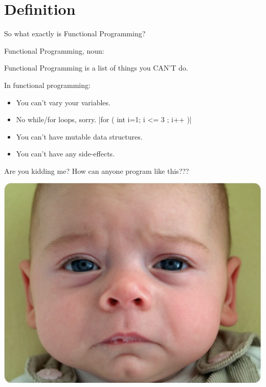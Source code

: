 \documentclass{beamer}
\begin{document}
\section{Definition}

\begin{frame}{}

  {\Large So what exactly is Functional Programming?}

\end{frame}

\begin{frame}{Functional Programming, noun:}

  \begin{exampleblock}{}
    {\Huge
      Functional Programming is a list of things you CAN’T do.
      }
    \vskip5mm
    \hspace*{}
  \end{exampleblock}
\end{frame}

\begin{frame}

In functional programming:

  \begin{itemize}[<+->]
  \item You can't vary your variables.
  \item No while/for loops, sorry.
    |for ( int i=1; i <= 3 ; i++ )|
  \item You can't have mutable data structures.
  \item You can't have any side-effects.
  \end{itemize}
\end{frame}

\begin{frame}{Are you kidding me?}
  How can anyone program like this???
  \begin{center}
    \includegraphics[scale=0.3]{img/sadbaby.png}
  \end{center}
\end{frame}
\end{document}
